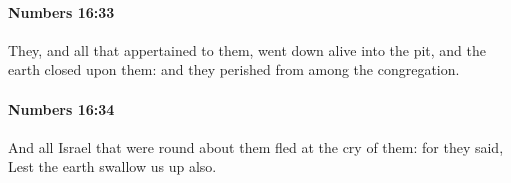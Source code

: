 		\paragraph{Numbers 16:33} %
			\label{NUMBERS-16-33}

			They, and all that appertained to them, went down alive into the pit, and the earth closed upon them: and they perished from among the congregation.


		\paragraph{Numbers 16:34} %
			\label{NUMBERS-16-34}

			And all Israel that were round about them fled at the cry of them: for they said, Lest the earth swallow us up also.


